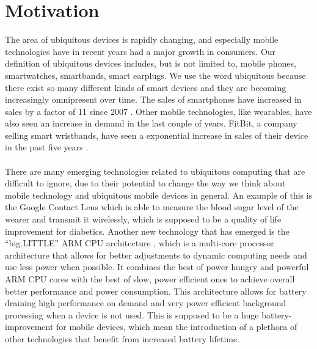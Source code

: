 
\chapter{Motivation}
\label{cha:motivation}

The area of ubiquitous devices is rapidly changing, and especially mobile technologies have in recent years had a major growth in consumers. Our definition of ubiquitous devices includes, but is not limited to, mobile phones, smartwatches, smartbands, smart earplugs. We use the word ubiquitous because there exist so many different kinds of smart devices and they are becoming increasingly omnipresent over time. The sales of smartphones have increased in sales by a factor of 11 since 2007 \parencite{statsia_smartphones}. Other mobile technologies, like wearables, have also seen an increase in demand in the last couple of years. FitBit, a company selling smart wristbands, have seen a exponential increase in sales of their device in the past five years \parencite{statsia_fitbit}.
\\\\
There are many emerging technologies related to ubiquitous computing that are difficult to ignore, due to their potential to change the way we think about mobile technology and ubiquitous mobile devices in general. An example of this is the Google Contact Lens \parencite{google_contact_lens} which is able to measure the blood sugar level of the wearer and transmit it wirelessly, which is supposed to be a quality of life improvement for diabetics. Another new technology that has emerged is the ``big.LITTLE'' ARM CPU architecture \parencite{big_little_architecture}, which is a multi-core processor architecture that allows for better adjustments to dynamic computing needs and use less power when possible. It combines the best of power hungry and powerful ARM CPU cores with the best of slow, power efficient ones to achieve overall better performance and power consumption. This architecture allows for battery draining high performance on demand and very power efficient background processing when a device is not used. This is supposed to be a huge battery-improvement for mobile devices, which mean the introduction of a plethora of other technologies that benefit from increased battery lifetime. 
